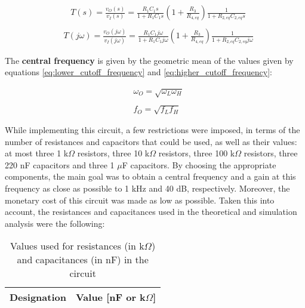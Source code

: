 \begin{equation} \label{eq:gain}
  \begin{aligned}
    &\;\;\;T(s)=\frac{v_O(s)}{v_I(s)}=\frac{R_1C_1s}{1+R_1C_1s}\left(1+\frac{R_3}{R_{4,eq}}\right)\frac{1}{1+R_{2,eq}C_{2,eq}s} \\
    \\
    &T(j\omega)=\frac{v_O(j\omega)}{v_I(j\omega)}=\frac{R_1C_1j\omega}{1+R_1C_1j\omega}\left(1+\frac{R_3}{R_{4,eq}}\right)\frac{1}{1+R_{2,eq}C_{2,eq}j\omega}  
  \end{aligned}
\end{equation}

The \textbf{central frequency} is given by the geometric mean of the values given by equations \ref{eq:lower_cutoff_frequency} and \ref{eq:higher_cutoff_frequency}:

\begin{equation} \label{eq:central_frequency}
  \begin{aligned}
    &\omega_O=\sqrt{\omega_L\omega_H} \\
    \\
    &f_O=\sqrt{f_Lf_H} 
  \end{aligned}
\end{equation}

While implementing this circuit, a few restrictions were imposed, in terms of the number of resistances and capacitors that could be used, as well as their values: at most three 1 k$\Omega$ resistors, three 10 k$\Omega$ resistors, three 100 k$\Omega$ resistors, three 220 nF capacitors and three 1 $\mu$F capacitors. By choosing the appropriate components, the main goal was to obtain a central frequency and a gain at this frequency as close as possible to 1 kHz and 40 dB, respectively. Moreover, the monetary cost of this circuit was made as low as possible. Taken this into account, the resistances and capacitances used in the theoretical and simulation analysis were the following:

\begin{table}[H]
  \centering
  \begin{tabular}{|c|c|}
    \hline    
    {\bf Designation} & {\bf Value [nF or k$\Omega$]} \\ \hline
    
  \end{tabular}
  \caption{Values used for resistances (in k$\Omega$) and capacitances (in nF) in the circuit}
  \label{tab:chosen_values}
\end{table}

